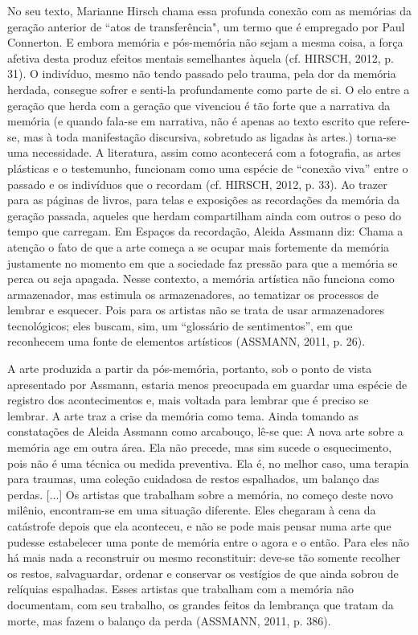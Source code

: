 \documentclass[../DISSERTACAO_MAIN.tex]{subfiles}
\begin{document}
No seu texto, Marianne Hirsch chama essa profunda conexão com as memórias da geração anterior de “atos de transferência", um termo que é empregado por Paul Connerton. E embora memória e pós-memória não sejam a mesma coisa, a força afetiva desta produz efeitos mentais semelhantes àquela (cf. HIRSCH, 2012, p. 31). O indivíduo, mesmo não tendo passado pelo trauma, pela dor da memória herdada, consegue sofrer e senti-la profundamente como parte de si.
O elo entre a geração que herda com a geração que vivenciou é tão forte que a narrativa da memória (e quando fala-se em narrativa, não é apenas ao texto escrito que refere-se, mas à toda manifestação discursiva, sobretudo as ligadas às artes.) torna-se uma necessidade. A literatura, assim como acontecerá com a fotografia, as artes plásticas e o testemunho, funcionam como uma espécie de “conexão viva” entre o passado e os indivíduos que o recordam (cf. HIRSCH, 2012, p. 33). Ao trazer para as páginas de livros, para telas e exposições as recordações da memória da geração passada, aqueles que herdam compartilham ainda com outros o peso do tempo que carregam. Em Espaços da recordação, Aleida Assmann diz:
Chama a atenção o fato de que a arte começa a se ocupar mais fortemente da memória justamente no momento em que a sociedade faz pressão para que a memória se perca ou seja apagada. Nesse contexto, a memória artística não funciona como armazenador, mas estimula os armazenadores, ao tematizar os processos de lembrar e esquecer. Pois para os artistas não se trata de usar armazenadores tecnológicos; eles buscam, sim, um “glossário de sentimentos”, em que reconhecem uma fonte de elementos artísticos (ASSMANN, 2011, p. 26).

A arte produzida a partir da pós-memória, portanto, sob o ponto de vista apresentado por Assmann, estaria menos preocupada em guardar uma espécie de registro dos acontecimentos e, mais voltada para lembrar que é preciso se lembrar. A arte traz a crise da memória como tema. Ainda tomando as constatações de Aleida Assmann como arcabouço, lê-se que:
A nova arte sobre a memória age em outra área. Ela não precede, mas sim sucede o esquecimento, pois não é uma técnica ou medida preventiva. Ela é, no melhor caso, uma terapia para traumas, uma coleção cuidadosa de restos espalhados, um balanço das perdas. [...] Os artistas que trabalham sobre a memória, no começo deste novo milênio, encontram-se em uma situação diferente. Eles chegaram à cena da catástrofe depois que ela aconteceu, e não se pode mais pensar numa arte que pudesse estabelecer uma ponte de memória entre o agora e o então. Para eles não há mais nada a reconstruir ou mesmo reconstituir: deve-se tão somente recolher os restos, salvaguardar, ordenar e conservar os vestígios de que ainda sobrou de relíquias espalhadas. Esses artistas que trabalham com a memória não documentam, com seu trabalho, os grandes feitos da lembrança que tratam da morte, mas fazem o balanço da perda (ASSMANN, 2011, p. 386).
\end{document}
